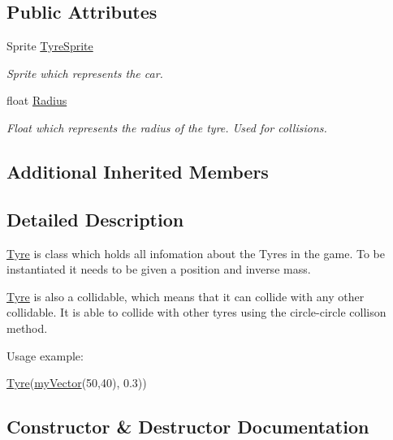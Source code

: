 \subsection*{Public Attributes}
\begin{DoxyCompactItemize}
\item 
\hypertarget{class_tyre_a068f6dcd12733c3df6d760053daf08ac}{}Sprite \hyperlink{class_tyre_a068f6dcd12733c3df6d760053daf08ac}{Tyre\+Sprite}\label{class_tyre_a068f6dcd12733c3df6d760053daf08ac}

\begin{DoxyCompactList}\small\item\em Sprite which represents the car. \end{DoxyCompactList}\item 
\hypertarget{class_tyre_a1c0fd8531b72c94915867cb90dd175c9}{}float \hyperlink{class_tyre_a1c0fd8531b72c94915867cb90dd175c9}{Radius}\label{class_tyre_a1c0fd8531b72c94915867cb90dd175c9}

\begin{DoxyCompactList}\small\item\em Float which represents the radius of the tyre. Used for collisions. \end{DoxyCompactList}\end{DoxyCompactItemize}
\subsection*{Additional Inherited Members}


\subsection{Detailed Description}
\hyperlink{class_tyre}{Tyre} is class which holds all infomation about the Tyres in the game. To be instantiated it needs to be given a position and inverse mass.

\hyperlink{class_tyre}{Tyre} is also a collidable, which means that it can collide with any other collidable. It is able to collide with other tyres using the circle-\/circle collison method.

Usage example\+: 
\begin{DoxyCode}
\hyperlink{class_tyre_a162dbaad7ae74443df530dfb147fb694}{Tyre}(\hyperlink{classmy_vector}{myVector}(50,40), 0.3))
\end{DoxyCode}
 

\subsection{Constructor \& Destructor Documentation}
\hypertarget{class_tyre_a162dbaad7ae74443df530dfb147fb694}{}
